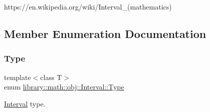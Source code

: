 https\+://en.wikipedia.\+org/wiki/\+Interval\+\_\+(mathematics) 

\subsection{Member Enumeration Documentation}
\mbox{\label{classlibrary_1_1math_1_1obj_1_1_interval_abc7177f1c446d8273e70c989953667d1}} 
\subsubsection{\texorpdfstring{Type}{Type}}
{\footnotesize\ttfamily template$<$class T$>$ \\
enum \hyperlink{classlibrary_1_1math_1_1obj_1_1_interval_abc7177f1c446d8273e70c989953667d1}{library\+::math\+::obj\+::\+Interval\+::\+Type}\hspace{0.3cm}{\ttfamily [strong]}}



\hyperlink{classlibrary_1_1math_1_1obj_1_1_interval}{Interval} type. 

